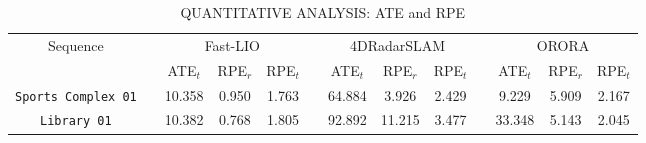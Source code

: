 \begin{table}[t]
\centering
\caption{QUANTITATIVE ANALYSIS: ATE and RPE}
\begin{adjustbox}{width=1\linewidth}
{
\begin{tabular}{c|cccccccccccc}
\toprule
\multirow{2}{*}{Sequence} &
 &
   \multicolumn{3}{c}{Fast-LIO}
 &
 &
  \multicolumn{3}{c}{4DRadarSLAM}
 &
 &
  \multicolumn{3}{c}{ORORA}
  \\ \cline{3-5} \cline{7-9} \cline{11-13} \rule{0pt}{2.5ex}
  &
  &
  ATE$_{t}$ &
  RPE$_r$ &
  RPE$_t$ &
  &
  ATE$_{t}$ &
  RPE$_r$ &
  RPE$_t$ &
  &
  ATE$_{t}$ &
  RPE$_r$ &
  RPE$_t$ 
\\ 
\midrule
\multirow{1}{*}{\texttt{Sports Complex 01}}
& & 
10.358 & 0.950 & 1.763 & &
64.884 & 3.926 & 2.429 & & 
 9.229 & 5.909 & 2.167 \\
\midrule
\multirow{1}{*}{\texttt{Library 01}}
& & 
10.382  & 0.768 & 1.805 &  & 
92.892 & 11.215 &  3.477 & & 
33.348 & 5.143 & 2.045  \\
\bottomrule
\end{tabular}
}
\end{adjustbox}
\label{tab:slam}
\vspace{-2mm}
\end{table}
